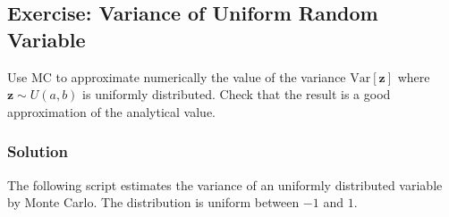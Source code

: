 \documentclass[letterpaper,10pt,english]{jupyterBook}
\begin{document}
\subsection{Exercise: Variance of Uniform Random Variable}
\label{\detokenize{01:exercise-variance-of-uniform-random-variable}}
\sphinxAtStartPar
Use MC to approximate numerically the value of the variance \(\mbox{Var}[{\mathbf z}]\) where \({\mathbf z} \sim U(a,b)\) is uniformly distributed. Check that the result is a good approximation of the analytical value.


\subsubsection{Solution}
\label{\detokenize{01:id7}}
\sphinxAtStartPar
The following script estimates the variance of an uniformly distributed variable by Monte Carlo. The distribution is uniform between \(-1\) and \(1\).
\end{document}
